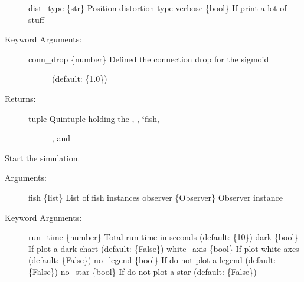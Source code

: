 \documentclass[letterpaper,10pt,english]{sphinxmanual}
\begin{document}
\begin{fulllineitems}
\begin{description}
\begin{description}
\end{description}

dist\_type \{str\} \textendash{} Position distortion type
verbose \{bool\} \textendash{} If  print a lot of stuff

\item[{Keyword Arguments:}] \leavevmode\begin{description}
\item[{conn\_drop \{number\} \textendash{} Defined the connection drop for the sigmoid}] \leavevmode
(default: \{1.0\})

\end{description}

\item[{Returns:}] \leavevmode\begin{description}
\item[{tuple \textendash{} Quintuple holding the , , {\color{red}\bfseries{}{}`}fish,}] \leavevmode
{}, and 

\end{description}

\end{description}

\end{fulllineitems}


\begin{fulllineitems}
\label{\detokenize{index:utils.run_simulation}}
Start the simulation.
\begin{description}
\item[{Arguments:}] \leavevmode
fish \{list\} \textendash{} List of fish instances
observer \{Observer\} \textendash{} Observer instance

\item[{Keyword Arguments:}] \leavevmode
run\_time \{number\} \textendash{} Total run time in seconds (default: \{10\})
dark \{bool\} \textendash{} If  plot a dark chart (default: \{False\})
white\_axis \{bool\} \textendash{} If  plot white axes (default: \{False\})
no\_legend \{bool\} \textendash{} If  do not plot a legend (default: \{False\})
no\_star \{bool\} \textendash{} If  do not plot a star (default: \{False\})

\end{description}

\end{fulllineitems}
\end{document}
